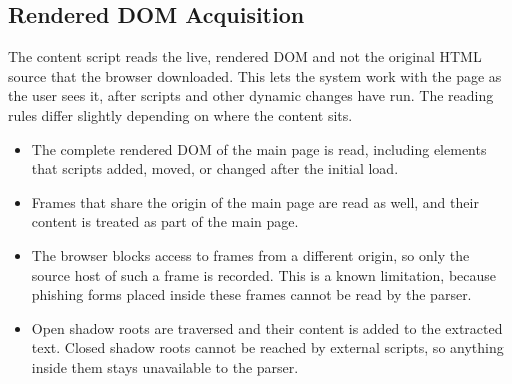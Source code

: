 \documentclass{FastFyp}
\begin{document}
\subsection{Rendered DOM Acquisition}
\label{sec:dom-acquisition}
The content script reads the live, rendered DOM and not the original HTML source that the browser downloaded. This lets the system work with the page as the user sees it, after scripts and other dynamic changes have run. The reading rules differ slightly depending on where the content sits.
\begin{itemize}
    \item The complete rendered DOM of the main page is read, including elements that scripts added, moved, or changed after the initial load.
    \item Frames that share the origin of the main page are read as well, and their content is treated as part of the main page.
    \item The browser blocks access to frames from a different origin, so only the source host of such a frame is recorded. This is a known limitation, because phishing forms placed inside these frames cannot be read by the parser.
    \item Open shadow roots are traversed and their content is added to the extracted text. Closed shadow roots cannot be reached by external scripts, so anything inside them stays unavailable to the parser.
\end{itemize}
\end{document}
